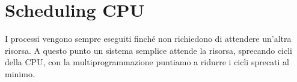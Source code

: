 \chapter{Scheduling CPU}
I processi vengono sempre eseguiti finché non richiedono di attendere un'altra risorsa.
A questo punto un sistema semplice attende la risorsa, sprecando cicli della CPU, con la multiprogrammazione puntiamo a ridurre i cicli sprecati al minimo.





